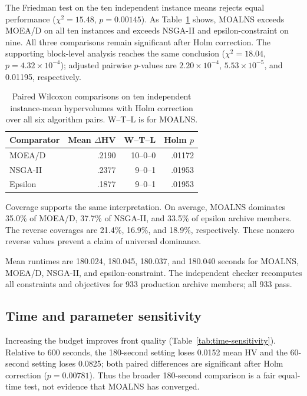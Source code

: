 \documentclass[11pt,a4paper]{article}
\newcommand{\MOALNS}{MOALNS}
\begin{document}
The Friedman test on the ten independent instance means rejects equal
performance ($\chi^2=15.48$, $p=0.00145$). As
Table~\ref{tab:production-stats} shows, \MOALNS{} exceeds MOEA/D on all ten
instances and exceeds NSGA-II and epsilon-constraint on nine. All three
comparisons remain significant after Holm correction. The supporting
block-level analysis reaches the same conclusion
($\chi^2=18.04$, $p=4.32\times10^{-4}$); adjusted pairwise $p$-values are
$2.20\times10^{-4}$, $5.53\times10^{-5}$, and 0.01195, respectively.

\begin{table}[tbp]
\centering
\caption{Paired Wilcoxon comparisons on ten independent instance-mean
hypervolumes with Holm correction over all six algorithm pairs. W--T--L is for
\MOALNS{}.}
\label{tab:production-stats}
\begin{tabular}{lrrr}
\toprule
Comparator & Mean $\Delta$HV & W--T--L & Holm $p$\\
\midrule
MOEA/D & .2190 & 10--0--0 & .01172\\
NSGA-II & .2377 & 9--0--1 & .01953\\
Epsilon & .1877 & 9--0--1 & .01953\\
\bottomrule
\end{tabular}
\end{table}

Coverage supports the same interpretation. On average, \MOALNS{} dominates
35.0\% of MOEA/D, 37.7\% of NSGA-II, and 33.5\% of epsilon archive members.
The reverse coverages are 21.4\%, 16.9\%, and 18.9\%, respectively. These
nonzero reverse values prevent a claim of universal dominance.

Mean runtimes are 180.024, 180.045, 180.037, and 180.040 seconds for
\MOALNS{}, MOEA/D, NSGA-II, and epsilon-constraint. The independent checker
recomputes all constraints and objectives for 933 production archive members;
all 933 pass.

\subsection{Time and parameter sensitivity}

Increasing the budget improves front quality
(Table~\ref{tab:time-sensitivity}). Relative to 600 seconds, the 180-second
setting loses 0.0152 mean HV and the 60-second setting loses 0.0825; both paired
differences are significant after Holm correction ($p=0.00781$). Thus the
broader 180-second comparison is a fair equal-time test, not evidence that
\MOALNS{} has converged.
\end{document}
